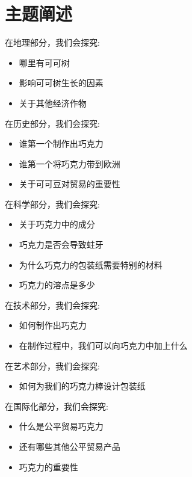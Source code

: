 \chapter{主题阐述}
    在地理部分，我们会探究:\par
   

    \begin{itemize}
      \item 哪里有可可树
      \item 影响可可树生长的因素
      \item 关于其他经济作物
    \end{itemize}  
    

    在历史部分，我们会探究:\par


    \begin{itemize}
      \item 谁第一个制作出巧克力
      \item 谁第一个将巧克力带到欧洲
      \item 关于可可豆对贸易的重要性
    \end{itemize} 
    

    在科学部分，我们会探究:\par
    

    \begin{itemize}
      \item 关于巧克力中的成分
      \item 巧克力是否会导致蛀牙
      \item 为什么巧克力的包装纸需要特别的材料
      \item 巧克力的溶点是多少
    \end{itemize} 



    在技术部分，我们会探究:\par


    \begin{itemize}
      \item 如何制作出巧克力
      \item 在制作过程中，我们可以向巧克力中加上什么
    \end{itemize}

    
    在艺术部分，我们会探究:\par
    

    \begin{itemize}
      \item 如何为我们的巧克力棒设计包装纸 
    \end{itemize}  



    在国际化部分，我们会探究:\par
    

    \begin{itemize}
      \item 什么是公平贸易巧克力
      \item 还有哪些其他公平贸易产品
      \item 巧克力的重要性
    \end{itemize}
